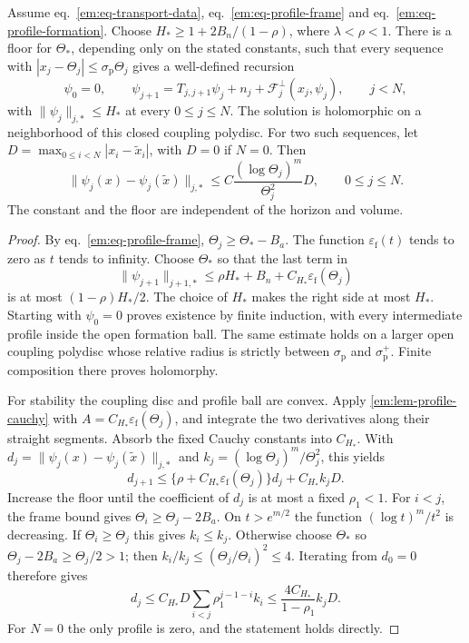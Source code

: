 \documentclass[11pt,letterpaper,reqno]{amsart}
\makeatletter
\numberwithin{equation}{section}
\renewcommand{\eqref}[1]{\textup{eq.~\ref{#1}}}
\theoremstyle{definition}
\newcommand{\ms@majorstart}{%
  \pushQED{\qed}\renewcommand{\qedsymbol}{$\blacksquare\square$}}
\newenvironment{theorem}[1][]{\ms@majorstart\ms@theorem[#1]}
  {\popQED\endms@theorem}
\theoremstyle{remark}
\makeatother
\begin{document}
\begin{theorem}[Uniform forward profile bounds]\label{em:thm-profile}
Assume \eqref{em:eq-transport-data}, \eqref{em:eq-profile-frame}
and \eqref{em:eq-profile-formation}. Choose
$H_*\ge1+2B_n/(1-\rho)$, where $\lambda<\rho<1$.
There is a floor for $\Theta_*$, depending only on the stated constants,
such that every sequence with $|x_j-\Theta_j|\le\sigma_{\mathrm p} \Theta_j$ gives a
well-defined recursion
\begin{equation}\label{em:eq-profile-recursion}
 \psi_0=0,\qquad
 \psi_{j+1}=T_{j,j+1}\psi_j+n_j+\mathcal F_j^{\perp}(x_j,\psi_j),\qquad j<N,
\end{equation}
with $\|\psi_j\|_{j,*}\le H_*$ at every $0\le j\le N$.
The solution is holomorphic on a neighborhood of this closed
coupling polydisc. For two such sequences, let
$D=\max_{0\le i<N}|x_i-\widetilde x_i|$, with $D=0$ if $N=0$.
Then
\begin{equation}\label{em:eq-profile-stability}
 \|\psi_j(x)-\psi_j(\widetilde x)\|_{j,*}
 \le C\frac{(\log \Theta_j)^m}{\Theta_j^2}D,
 \qquad 0\le j\le N.
\end{equation}
The constant and the floor are independent of the horizon and volume.
\end{theorem}
\begin{proof}
By \eqref{em:eq-profile-frame}, $\Theta_j\ge \Theta_*-B_a$.
The function $\varepsilon_{\mathrm f}(t)$ tends to zero as $t$ tends
to infinity. Choose $\Theta_*$ so that the last term in
\[
 \|\psi_{j+1}\|_{j+1,*}
 \le\rho H_*+B_n+C_{H_*}\varepsilon_{\mathrm f}(\Theta_j)
\]
is at most $(1-\rho)H_*/2$. The choice of $H_*$ makes the
right side at most $H_*$. Starting with $\psi_0=0$ proves existence
by finite induction, with every intermediate profile inside the
open formation ball. The same estimate holds on a larger open
coupling polydisc whose relative radius is strictly between
$\sigma_{\mathrm p}$ and $\sigma_{\mathrm p}^+$. Finite composition there proves holomorphy.

For stability the coupling disc and profile ball are convex.
Apply \cref{em:lem-profile-cauchy} with
$A=C_{H_*}\varepsilon_{\mathrm f}(\Theta_j)$, and integrate the
two derivatives along their straight segments. Absorb the fixed
Cauchy constants into $C_{H_*}$. With
$d_j=\|\psi_j(x)-\psi_j(\widetilde x)\|_{j,*}$ and
$k_j=(\log \Theta_j)^m/\Theta_j^2$, this yields
\[
 d_{j+1}\le
  \{\rho+C_{H_*}\varepsilon_{\mathrm f}(\Theta_j)\}d_j
  +C_{H_*}k_jD.
\]
Increase the floor until the coefficient of $d_j$ is at most
a fixed $\rho_1<1$. For $i<j$, the frame bound gives
$\Theta_i\ge \Theta_j-2B_a$. On $t>e^{m/2}$ the function
$(\log t)^m/t^2$ is decreasing. If $\Theta_i\ge \Theta_j$ this gives
$k_i\le k_j$. Otherwise choose $\Theta_*$ so $\Theta_j-2B_a\ge \Theta_j/2>1$;
then $k_i/k_j\le(\Theta_j/\Theta_i)^2\le4$.
Iterating from $d_0=0$ therefore gives
\[
 d_j\le C_{H_*}D\sum_{i<j}\rho_1^{j-1-i}k_i
 \le\frac{4C_{H_*}}{1-\rho_1}k_jD.
\]
For $N=0$ the only profile is zero, and the statement holds directly.
\end{proof}
\end{document}
